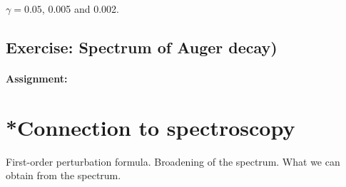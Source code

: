 $\gamma = 0.05$, 0.005 and 0.002.



\subsection*{Exercise: Spectrum of Auger decay)}


\paragraph{Assignment:} 




\section{*Connection to spectroscopy}

First-order perturbation formula. Broadening of the spectrum. What we can obtain from the spectrum.